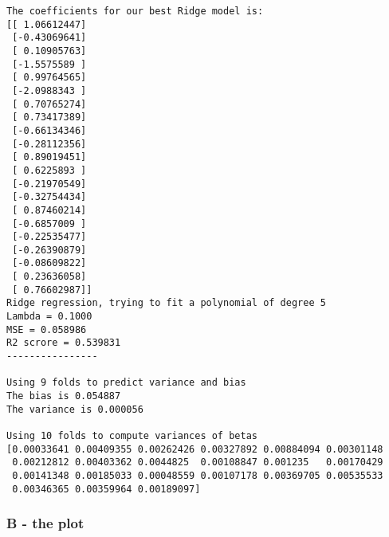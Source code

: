 \documentclass[11pt]{article}
\begin{document}
    \begin{Verbatim}[commandchars=\\\{\}]
The coefficients for our best Ridge model is:
[[ 1.06612447]
 [-0.43069641]
 [ 0.10905763]
 [-1.5575589 ]
 [ 0.99764565]
 [-2.0988343 ]
 [ 0.70765274]
 [ 0.73417389]
 [-0.66134346]
 [-0.28112356]
 [ 0.89019451]
 [ 0.6225893 ]
 [-0.21970549]
 [-0.32754434]
 [ 0.87460214]
 [-0.6857009 ]
 [-0.22535477]
 [-0.26390879]
 [-0.08609822]
 [ 0.23636058]
 [ 0.76602987]]
Ridge regression, trying to fit a polynomial of degree 5 
Lambda = 0.1000
MSE = 0.058986
R2 scrore = 0.539831
----------------

Using 9 folds to predict variance and bias
The bias is 0.054887
The variance is 0.000056

Using 10 folds to compute variances of betas
[0.00033641 0.00409355 0.00262426 0.00327892 0.00884094 0.00301148
 0.00212812 0.00403362 0.0044825  0.00108847 0.001235   0.00170429
 0.00141348 0.00185033 0.00048559 0.00107178 0.00369705 0.00535533
 0.00346365 0.00359964 0.00189097]

    \end{Verbatim}

    \subsubsection{B - the plot}\label{b---the-plot}
\end{document}
